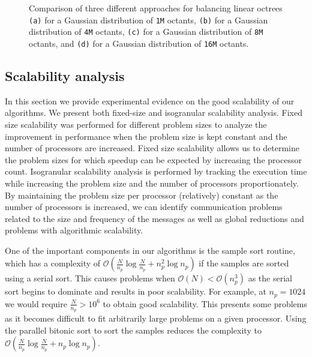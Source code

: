 \begin{figure}
\begin{center}
  \end{center}
  \caption{Comparison of three different approaches for balancing linear octrees {\tt(a)} for a Gaussian distribution of {\tt1M} octants, {\tt(b)} for a Gaussian distribution of {\tt4M} octants, {\tt(c)} for a Gaussian distribution of {\tt8M} octants, and {\tt(d)} for a Gaussian distribution of {\tt16M} octants.}
  \label{fig:smy}
\end{figure}

\subsection{Scalability analysis}
\label{sec:scal}
In this section we provide experimental evidence on the good
scalability of our algorithms. We present both fixed-size and
isogranular scalability analysis.  Fixed size scalability was
performed for different problem sizes to analyze the improvement in
performance when the problem size is kept constant and the number of
processors are increased. Fixed size scalability allows us to
determine the problem sizes for which speedup can be expected by
increasing the processor count. Isogranular scalability analysis is
performed by tracking the execution time while increasing the problem
size and the number of processors proportionately. By maintaining the
problem size per processor (relatively) constant as the number of
processors is increased, we can identify communication problems
related to the size and frequency of the messages as well as global
reductions and problems with algorithmic scalability.

One of the important components in our algorithms is the sample sort
routine, which has a complexity of $\mathcal{O}(\frac{N}{n_p}\log
\frac{N}{n_p} + n_p^2\log n_p)$ if the samples are sorted using a
serial sort. This causes problems when $\mathcal{O}(N) < \mathcal{O}(n_p^3)$ as the
serial sort begins to dominate and results in poor scalability. For
example, at $n_p=1024$ we would require $\frac{N}{n_p} > 10^6$ to obtain good
scalability. This presents some problems as it becomes difficult to
fit arbitrarily large problems on a given processor. Using the
parallel bitonic sort to sort the samples \cite{karypis03} reduces the
complexity to $\mathcal{O}(\frac{N}{n_p} \log \frac{N}{n_p} + n_p \log
n_p)$.

